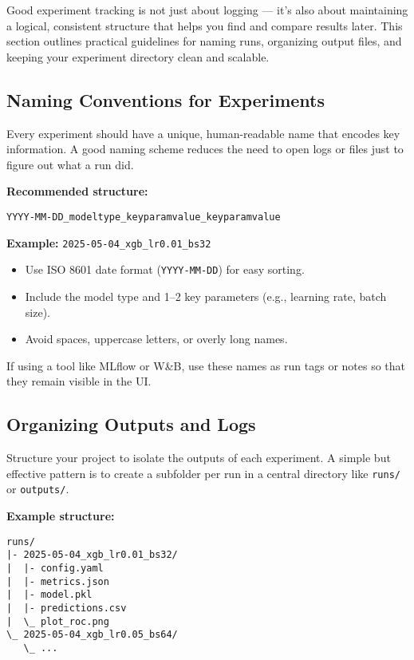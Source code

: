 \documentclass[12pt,openany]{book}
\begin{document}
Good experiment tracking is not just about logging — it’s also about maintaining a logical, consistent structure that helps you find and compare results later. This section outlines practical guidelines for naming runs, organizing output files, and keeping your experiment directory clean and scalable.

\subsection{Naming Conventions for Experiments}

Every experiment should have a unique, human-readable name that encodes key information. A good naming scheme reduces the need to open logs or files just to figure out what a run did. \newline

\textbf{Recommended structure:}
\begin{verbatim}
YYYY-MM-DD_modeltype_keyparamvalue_keyparamvalue
\end{verbatim}

\textbf{Example:} \texttt{2025-05-04\_xgb\_lr0.01\_bs32}

\begin{itemize}
    \item Use ISO 8601 date format (\texttt{YYYY-MM-DD}) for easy sorting.
    \item Include the model type and 1–2 key parameters (e.g., learning rate, batch size).
    \item Avoid spaces, uppercase letters, or overly long names.
\end{itemize}

If using a tool like MLflow or W\&B, use these names as run tags or notes so that they remain visible in the UI.

\subsection{Organizing Outputs and Logs}

Structure your project to isolate the outputs of each experiment. A simple but effective pattern is to create a subfolder per run in a central directory like \texttt{runs/} or \texttt{outputs/}. \newline

\textbf{Example structure:}
\begin{verbatim}
runs/
|- 2025-05-04_xgb_lr0.01_bs32/
|  |- config.yaml
|  |- metrics.json
|  |- model.pkl
|  |- predictions.csv
|  \_ plot_roc.png
\_ 2025-05-04_xgb_lr0.05_bs64/
   \_ ...
\end{verbatim}
\end{document}
